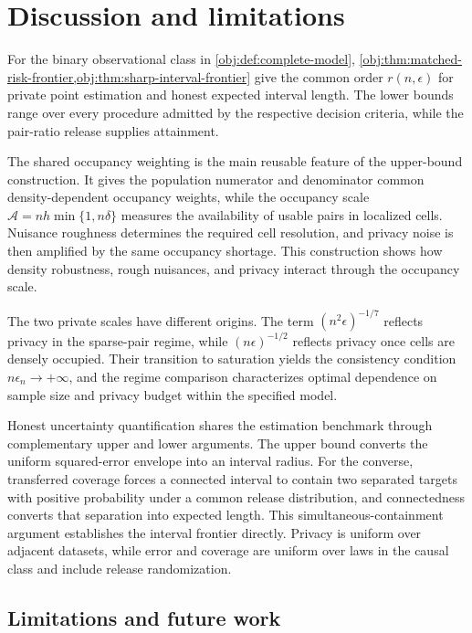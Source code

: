 \section{Discussion and limitations}

For the binary observational class in \cref{obj:def:complete-model}, \cref{obj:thm:matched-risk-frontier,obj:thm:sharp-interval-frontier} give the common order \(r(n,\epsilon)\) for private point estimation and honest expected interval length. The lower bounds range over every procedure admitted by the respective decision criteria, while the pair-ratio release supplies attainment.

The shared occupancy weighting is the main reusable feature of the upper-bound construction. It gives the population numerator and denominator common density-dependent occupancy weights, while the occupancy scale \(\mathcal A=nh\min\{1,n\delta\}\) measures the availability of usable pairs in localized cells. Nuisance roughness determines the required cell resolution, and privacy noise is then amplified by the same occupancy shortage. This construction shows how density robustness, rough nuisances, and privacy interact through the occupancy scale.

The two private scales have different origins. The term \((n^2\epsilon)^{-1/7}\) reflects privacy in the sparse-pair regime, while \((n\epsilon)^{-1/2}\) reflects privacy once cells are densely occupied. Their transition to saturation yields the consistency condition \(n\epsilon_n\to+\infty\), and the regime comparison characterizes optimal dependence on sample size and privacy budget within the specified model.

Honest uncertainty quantification shares the estimation benchmark through complementary upper and lower arguments. The upper bound converts the uniform squared-error envelope into an interval radius. For the converse, transferred coverage forces a connected interval to contain two separated targets with positive probability under a common release distribution, and connectedness converts that separation into expected length. This simultaneous-containment argument establishes the interval frontier directly. Privacy is uniform over adjacent datasets, while error and coverage are uniform over laws in the causal class and include release randomization.

\subsection{Limitations and future work}


